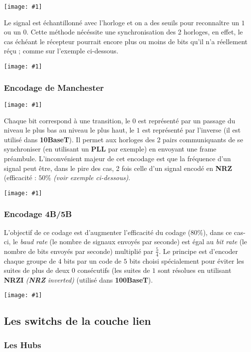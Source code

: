 \documentclass{article}
\newcommand{\imgR}[2]{\begin{center}\texttt{[image: \#1]}\end{center}}
\begin{document}
\imgR{CN_119.png}{225}

\noindent Le signal est échantillonné avec l'horloge et on a des seuils pour reconnaître un $1$ ou un $0$. Cette 
méthode nécéssite une synchronisation des 2 horloges, en effet, le cas échéant le récepteur pourrait encore plus 
ou moins de bits qu'il n'a réellement réçu ; comme sur l'exemple ci-dessous.

\imgR{CN_120.png}{225}

\subsubsection{Encodage de Manchester}

\imgR{CN_121.png}{225}

Chaque bit correspond à une transition, le $0$ est représenté par un passage du niveau le plus bas au niveau le 
plus haut, le $1$ est représenté par l'inverse (il est utilisé dans \textbf{10BaseT}). Il permet aux horloges des
2 pairs communiquants de se synchroniser (en utilisant un \textbf{PLL} par exemple) en envoyant une frame 
préambule. L'inconvénient majeur de cet encodage est que la fréquence d'un signal peut être, dans le pire des 
cas, 2 fois celle d'un signal encodé en \textbf{NRZ} (efficacité : $50\%$ \textit{(voir exemple ci-dessous)}.

\imgR{CN_122.png}{300}

\subsubsection{Encodage 4B/5B}

L'objectif de ce codage est d'augmenter l'efficacité du codage ($80\%$), dans ce cas-ci, le \textit{baud rate} 
(le nombre de signaux envoyés par seconde) est égal au \textit{bit rate} (le nombre de bits envoyés par seconde)
multiplié par $\frac{5}{4}$. Le principe est d'encoder chaque groupe de $4$ bits par un code de $5$ bits choisi
spécialement pour éviter les suites de plus de deux $0$ consécutifs (les suites de $1$ sont résolues en utilisant 
\textbf{NRZI} \textit{(\textbf{NRZ} inverted)} (utilisé dans \textbf{100BaseT}).

\imgR{CN_123.png}{300}

\subsection{Les switchs de la couche lien}

\subsubsection{Les Hubs}
\end{document}
